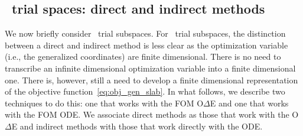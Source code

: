 \subsection{\spaceTimeAcronym\ trial spaces: direct and indirect methods}
We now briefly consider \spaceTimeAcronym\ trial subspaces. 
For \spaceTimeAcronym\ trial subspaces, the distinction between a direct and indirect method is less clear as the optimization variable (i.e., the generalized coordinates) are finite 
dimensional. There is no need to transcribe an infinite dimensional optimization variable into a finite dimensional one. There is, however, still a need to develop a finite 
dimensional representation of the objective function~\eqref{eq:obj_gen_slab}. In what follows, we describe two techniques to do this: one that works with the FOM O$\Delta$E and one that works with the FOM ODE. We associate direct methods as those 
that work with the O$\Delta$E and indirect methods with those that work directly with the ODE.  

